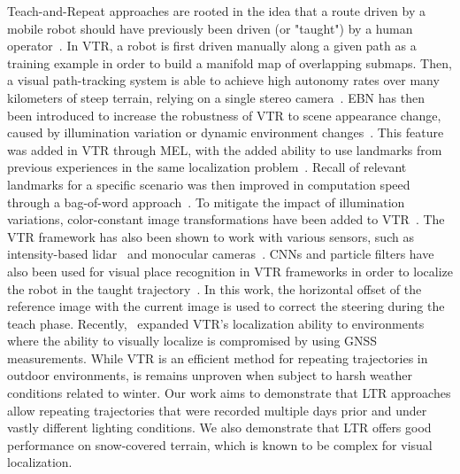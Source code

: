 Teach-and-Repeat approaches are rooted in the idea that a route driven by a mobile robot should have previously been driven (or "taught") by a human operator~\citep{Furgale2010}.
In \ac{VTR}, a robot is first driven manually along a given path as a training example in order to build a manifold map of overlapping submaps. 
Then, a visual path-tracking system is able to achieve high autonomy rates over many kilometers of steep terrain, relying on a single stereo camera~\citep{Furgale2010}. %
\ac{EBN} has then been introduced to increase the robustness of \ac{VTR} to scene appearance change, caused by illumination variation or dynamic environment changes~\citep{Churchill2013}. 
This feature was added in \ac{VTR} through \ac{MEL}, with the added ability to use landmarks from previous experiences in the same localization problem~\citep{Paton2016}.
Recall of relevant landmarks for a specific scenario was then improved in computation speed through a bag-of-word approach~\citep{MacTavish2017}.
To mitigate the impact of illumination variations, color-constant image transformations have been added to \ac{VTR}~\citep{Paton2015}. %
The \ac{VTR} framework has also been shown to work with various sensors, such as intensity-based lidar~\citep{McManus2013} and monocular cameras~\citep{Clement2017}.
\acp{CNN} and particle filters have also been used for visual place recognition in \ac{VTR} frameworks in order to localize the robot in the taught trajectory~\citep{Camara2020}.
In this work, the horizontal offset of the reference image with the current image is used to correct the steering during the teach phase.
Recently,~\citet{Congram2021} expanded \ac{VTR}'s localization ability to environments where the ability to visually localize is compromised by using \ac{GNSS} measurements.
While \ac{VTR} is an efficient method for repeating trajectories in outdoor environments, is remains unproven when subject to harsh weather conditions related to winter.
Our work aims to demonstrate that \ac{LTR} approaches allow repeating trajectories that were recorded multiple days prior and under vastly different lighting conditions. %
We also demonstrate that \ac{LTR} offers good performance on snow-covered terrain, which is known to be complex for visual localization.


